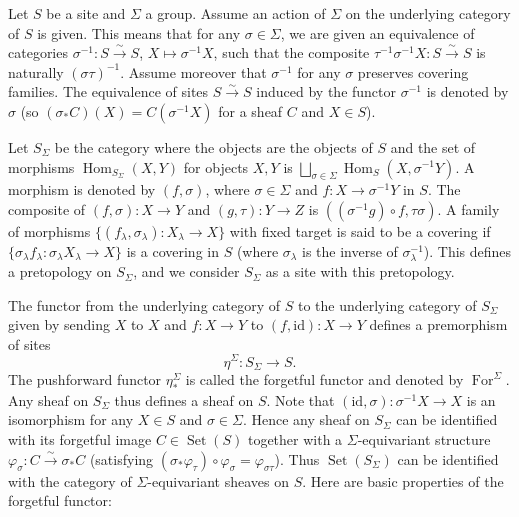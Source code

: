 \documentclass{amsart}
\theoremstyle{remark}
\numberwithin{equation}{subsection}
\newcommand{\isomto}{\overset{\sim}{\to}}
\newcommand{\compose}{\mathbin{\circ}}
\newcommand{\id}{\mathrm{id}}
\DeclareMathOperator{\Hom}{Hom}
\DeclareMathOperator{\Set}{Set}
\DeclareMathOperator{\For}{For}
\begin{document}
Let $S$ be a site and $\Sigma$ a group.
Assume an action of $\Sigma$ on the underlying category of $S$ is given.
This means that for any $\sigma \in \Sigma$,
we are given an equivalence of categories
$\sigma^{-1} \colon S \isomto S$, $X \mapsto \sigma^{-1} X$,
such that the composite $\tau^{-1} \sigma^{-1} X \colon S \isomto S$ is
naturally $(\sigma \tau)^{-1}$.
Assume moreover that $\sigma^{-1}$ for any $\sigma$ preserves covering families.
The equivalence of sites $S \isomto S$ induced by the functor $\sigma^{-1}$
is denoted by $\sigma$
(so $(\sigma_{\ast} C)(X) = C(\sigma^{-1} X)$ for a sheaf $C$ and $X \in S$).

Let $S_{\Sigma}$ be the category where the objects are the objects of $S$
and the set of morphisms $\Hom_{S_{\Sigma}}(X, Y)$ for objects $X, Y$
is $\bigsqcup_{\sigma \in \Sigma} \Hom_{S}(X, \sigma^{-1} Y)$.
A morphism is denoted by $(f, \sigma)$,
where $\sigma \in \Sigma$ and $f \colon X \to \sigma^{-1} Y$ in $S$.
The composite of $(f, \sigma) \colon X \to Y$ and $(g, \tau) \colon Y \to Z$
is $((\sigma^{-1} g) \compose f, \tau \sigma)$.
A family of morphisms $\{(f_{\lambda}, \sigma_{\lambda}) \colon X_{\lambda} \to X\}$
with fixed target is said to be a covering
if $\{\sigma_{\lambda} f_{\lambda} \colon \sigma_{\lambda} X_{\lambda} \to X\}$
is a covering in $S$ (where $\sigma_{\lambda}$ is the inverse of $\sigma_{\lambda}^{-1}$).
This defines a pretopology on $S_{\Sigma}$,
and we consider $S_{\Sigma}$ as a site with this pretopology.

The functor from the underlying category of $S$ to the underlying category of $S_{\Sigma}$
given by sending $X$ to $X$ and $f \colon X \to Y$ to $(f, \id) \colon X \to Y$
defines a premorphism of sites
	\begin{equation} \label{0519}
		\eta^{\Sigma} \colon S_{\Sigma} \to S.
	\end{equation}
The pushforward functor $\eta^{\Sigma}_{\ast}$ is called the forgetful functor
and denoted by $\For^{\Sigma}$.
Any sheaf on $S_{\Sigma}$ thus defines a sheaf on $S$.
Note that $(\id, \sigma) \colon \sigma^{-1} X \to X$ is an isomorphism
for any $X \in S$ and $\sigma \in \Sigma$.
Hence any sheaf on $S_{\Sigma}$ can be identified with its forgetful image $C \in \Set(S)$
together with a $\Sigma$-equivariant structure
$\varphi_{\sigma} \colon C \isomto \sigma_{\ast} C$
(satisfying $(\sigma_{\ast} \varphi_{\tau}) \compose \varphi_{\sigma} = \varphi_{\sigma \tau}$).
Thus $\Set(S_{\Sigma})$ can be identified with
the category of $\Sigma$-equivariant sheaves on $S$.
Here are basic properties of the forgetful functor:
\end{document}
